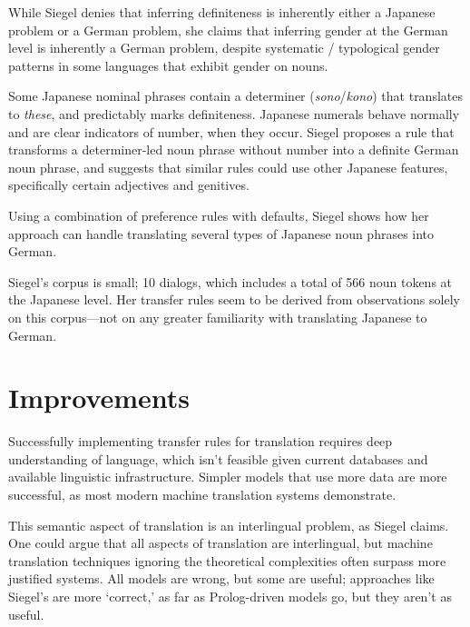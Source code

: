 \documentclass[11pt]{article}
\begin{document}
While Siegel denies that inferring definiteness is inherently either a Japanese problem or a German problem, she claims that inferring gender at the German level is inherently a German problem, despite systematic / typological gender patterns in some languages that exhibit gender on nouns.

Some Japanese nominal phrases contain a determiner (\emph{sono}/\emph{kono}) that translates to \emph{these}, and predictably marks definiteness. Japanese numerals behave normally and are clear indicators of number, when they occur. Siegel proposes a rule that transforms a determiner-led noun phrase without number into a definite German noun phrase, and suggests that similar rules could use other Japanese features, specifically certain adjectives and genitives.

Using a combination of preference rules with defaults, Siegel shows how her approach can handle translating several types of Japanese noun phrases into German.

Siegel's corpus is small; 10 dialogs, which includes a total of 566 noun tokens at the Japanese level. Her transfer rules seem to be derived from observations solely on this corpus---not on any greater familiarity with translating Japanese to German.



\pagebreak
\section{Improvements}

Successfully implementing transfer rules for translation requires deep understanding of language, which isn't feasible given current databases and available linguistic infrastructure. Simpler models that use more data are more successful, as most modern machine translation systems demonstrate.

This semantic aspect of translation is an interlingual problem, as Siegel claims. One could argue that all aspects of translation are interlingual, but machine translation techniques ignoring the theoretical complexities often surpass more justified systems.
All models are wrong, but some are useful; approaches like Siegel's are more `correct,' as far as Prolog-driven models go, but they aren't as useful.

\end{document}

